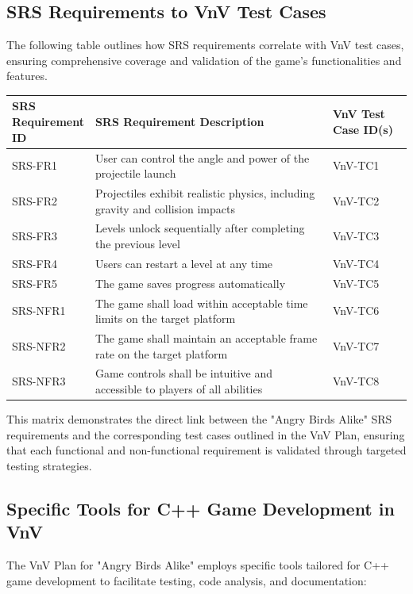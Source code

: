 \documentclass[12pt]{article}
\begin{document}
\subsection{SRS Requirements to VnV Test Cases}
The following table outlines how SRS requirements correlate with VnV test cases, ensuring comprehensive coverage and validation of the game's functionalities and features.

\begin{longtable}{|p{0.2\linewidth}|p{0.6\linewidth}|p{0.2\linewidth}|}
\hline
\textbf{SRS Requirement ID} & \textbf{SRS Requirement Description} & \textbf{VnV Test Case ID(s)} \\
\hline
SRS-FR1 & User can control the angle and power of the projectile launch & VnV-TC1 \\
SRS-FR2 & Projectiles exhibit realistic physics, including gravity and collision impacts & VnV-TC2 \\
SRS-FR3 & Levels unlock sequentially after completing the previous level & VnV-TC3 \\
SRS-FR4 & Users can restart a level at any time & VnV-TC4 \\
SRS-FR5 & The game saves progress automatically & VnV-TC5 \\
SRS-NFR1 & The game shall load within acceptable time limits on the target platform & VnV-TC6 \\
SRS-NFR2 & The game shall maintain an acceptable frame rate on the target platform & VnV-TC7 \\
SRS-NFR3 & Game controls shall be intuitive and accessible to players of all abilities & VnV-TC8 \\
\hline
\end{longtable}

This matrix demonstrates the direct link between the "Angry Birds Alike" SRS requirements and the corresponding test cases outlined in the VnV Plan, ensuring that each functional and non-functional requirement is validated through targeted testing strategies.

\subsection{Specific Tools for C++ Game Development in VnV}
The VnV Plan for "Angry Birds Alike" employs specific tools tailored for C++ game development to facilitate testing, code analysis, and documentation:
\end{document}
